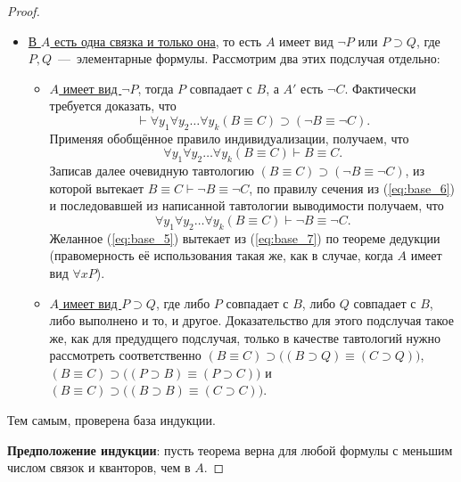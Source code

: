\begin{proof}
\begin{itemize}
        \item \underline{В $A$ есть одна связка и только она}, то есть $A$ имеет вид $\neg P$ или $P \supset Q$, где $P, Q$~---~элементарные формулы. Рассмотрим два этих подслучая отдельно:
        \begin{itemize}
            \item \underline{$A$ имеет вид $\neg P$}, тогда $P$ совпадает с $B$, а $A'$ есть $\neg C$. Фактически требуется доказать, что
            \begin{equation}\label{eq:base_5}
                \vdash \forall y_1\forall y_2\dots\forall y_k(B \equiv C) \supset (\neg B \equiv \neg C).
            \end{equation}
            Применяя обобщённое правило индивидуализации, получаем, что 
            \begin{equation}\label{eq:base_6}
                \forall y_1\forall y_2\dots\forall y_k(B \equiv C) \vdash B \equiv C. 
            \end{equation}
            Записав далее очевидную тавтологию $(B \equiv C) \supset (\neg B \equiv \neg C)$, из которой вытекает $B \equiv C \vdash \neg B \equiv \neg C$, по правилу сечения из (\ref{eq:base_6}) и последовавшей из написанной тавтологии выводимости получаем, что
            \begin{equation}\label{eq:base_7}
                \forall y_1\forall y_2\dots\forall y_k(B \equiv C) \vdash \neg B \equiv \neg C.
            \end{equation}
            Желанное (\ref{eq:base_5}) вытекает из (\ref{eq:base_7}) по теореме дедукции (правомерность её использования такая же, как в случае, когда $A$ имеет вид $\forall xP$).

            \item \underline{$A$ имеет вид $P \supset Q$}, где либо $P$ совпадает с $B$, либо $Q$ совпадает с $B$, либо выполнено и то, и другое. Доказательство для этого подслучая такое же, как для предудщего подслучая, только в качестве тавтологий нужно рассмотреть соответственно $(B \equiv C) \supset \big((B \supset Q) \equiv (C \supset Q)\big)$, $(B \equiv C) \supset \big((P \supset B) \equiv (P \supset C)\big)$ и $(B \equiv C) \supset \big((B \supset B) \equiv (C \supset C)\big)$.
        \end{itemize}
    \end{itemize}

    Тем самым, проверена база индукции.

    \textbf{Предположение индукции}: пусть теорема верна для любой формулы с меньшим числом связок и кванторов, чем в $A$. 


\end{proof}
